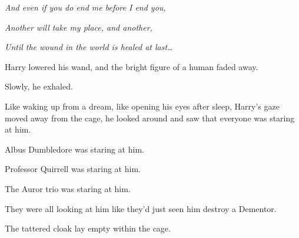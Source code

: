 \emph{And even if you do end me before I end you,}

\emph{Another will take my place, and another,}

\emph{Until the wound in the world is healed at last{\ldots}}

Harry lowered his wand, and the bright figure of a human faded away.

Slowly, he exhaled.

Like waking up from a dream, like opening his eyes after sleep, Harry's gaze
moved away from the cage, he looked around and saw that everyone was staring at
him.

Albus Dumbledore was staring at him.

Professor Quirrell was staring at him.

The Auror trio was staring at him.

They were all looking at him like they'd just seen him destroy a Dementor.

The tattered cloak lay empty within the cage.
